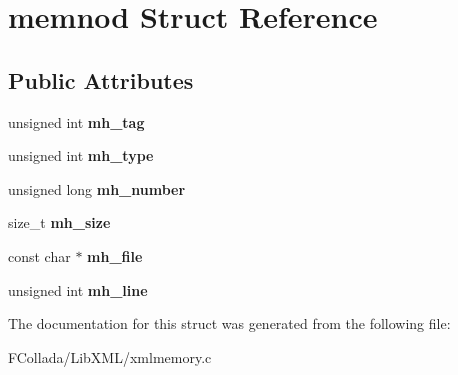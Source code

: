 \hypertarget{structmemnod}{
\section{memnod Struct Reference}
\label{structmemnod}
}
\subsection*{Public Attributes}
\begin{DoxyCompactItemize}
\item 
\hypertarget{structmemnod_a81b4b515be4f94e08b062fce633ff8eb}{
unsigned int {\bfseries mh\_\-tag}}
\label{structmemnod_a81b4b515be4f94e08b062fce633ff8eb}

\item 
\hypertarget{structmemnod_a3ff1672f505da28c2ddc6d684f601b82}{
unsigned int {\bfseries mh\_\-type}}
\label{structmemnod_a3ff1672f505da28c2ddc6d684f601b82}

\item 
\hypertarget{structmemnod_a30da7b53e926d3315300f419884c3f6b}{
unsigned long {\bfseries mh\_\-number}}
\label{structmemnod_a30da7b53e926d3315300f419884c3f6b}

\item 
\hypertarget{structmemnod_a9e6ad3432deb5bd3673a5630c7115736}{
size\_\-t {\bfseries mh\_\-size}}
\label{structmemnod_a9e6ad3432deb5bd3673a5630c7115736}

\item 
\hypertarget{structmemnod_a7d8d60ede78c8748c2b49804e3ff9baf}{
const char $\ast$ {\bfseries mh\_\-file}}
\label{structmemnod_a7d8d60ede78c8748c2b49804e3ff9baf}

\item 
\hypertarget{structmemnod_a7ec7067ebdc1ac7254c88d4faa3ed0fc}{
unsigned int {\bfseries mh\_\-line}}
\label{structmemnod_a7ec7067ebdc1ac7254c88d4faa3ed0fc}

\end{DoxyCompactItemize}


The documentation for this struct was generated from the following file:\begin{DoxyCompactItemize}
\item 
FCollada/LibXML/xmlmemory.c\end{DoxyCompactItemize}
